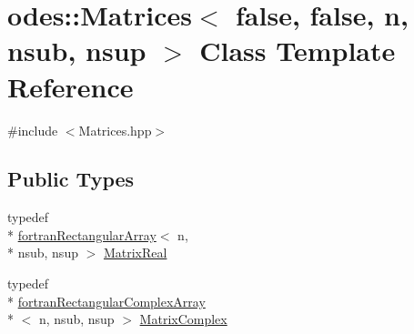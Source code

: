 \hypertarget{classodes_1_1Matrices_3_01false_00_01false_00_01n_00_01nsub_00_01nsup_01_4}{\section{odes\-:\-:Matrices$<$ false, false, n, nsub, nsup $>$ Class Template Reference}
\label{classodes_1_1Matrices_3_01false_00_01false_00_01n_00_01nsub_00_01nsup_01_4}
}


{\ttfamily \#include $<$Matrices.\-hpp$>$}

\subsection*{Public Types}
\begin{DoxyCompactItemize}
\item 
typedef \\*
\hyperlink{classodes_1_1fortranRectangularArray}{fortran\-Rectangular\-Array}$<$ n, \\*
nsub, nsup $>$ \hyperlink{classodes_1_1Matrices_3_01false_00_01false_00_01n_00_01nsub_00_01nsup_01_4_a16870437fa110da1b60636c6e108b357}{Matrix\-Real}
\item 
typedef \\*
\hyperlink{classodes_1_1fortranRectangularComplexArray}{fortran\-Rectangular\-Complex\-Array}\\*
$<$ n, nsub, nsup $>$ \hyperlink{classodes_1_1Matrices_3_01false_00_01false_00_01n_00_01nsub_00_01nsup_01_4_aeedabda8f5222d638b092cd1e4cf55f0}{Matrix\-Complex}
\end{DoxyCompactItemize}
